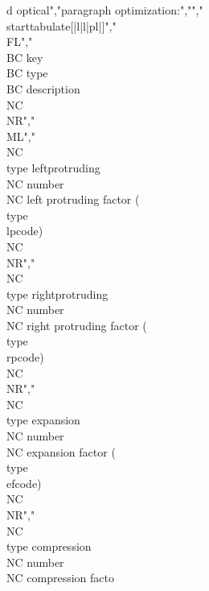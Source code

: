 d optical","paragraph optimization:","","\\starttabulate[|l|l|pl|]","\\FL","\\BC key                     \\BC type   \\BC description                               \\NC \\NR","\\ML","\\NC \\type {leftprotruding}  \\NC number \\NC left protruding factor  (\\type {\\lpcode}) \\NC \\NR","\\NC \\type {rightprotruding} \\NC number \\NC right protruding factor (\\type {\\rpcode}) \\NC \\NR","\\NC \\type {expansion}       \\NC number \\NC expansion factor        (\\type {\\efcode}) \\NC \\NR","\\NC \\type {compression}     \\NC number \\NC compression facto